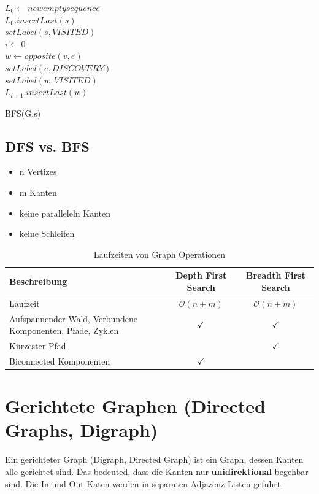 \begin{algorithm}[H]
	$L_0 \leftarrow new empty sequence$ \\
	$L_0.insertLast(s)$ \\
	$setLabel(s, VISITED)$ \\
	$i \leftarrow 0$ \\
	 {
		{
			{
				 {
					$w \leftarrow opposite(v,e)$ \\
					 {
						$setLabel(e, DISCOVERY)$ \\
						$setLabel(w, VISITED)$ \\
						$L_{i+1}.insertLast(w)$ \\
					}
				}
			}
		}
	}

	\caption{BFS(G,s)}
\end{algorithm}
\clearpage


\subsection{DFS vs. BFS}
\begin{itemize}
	\item n Vertizes
	\item m Kanten
	\item keine paralleleln Kanten
	\item keine Schleifen
\end{itemize}
\begin{table}[h]
	\centering
	\begin{tabu} to \linewidth {X c c}
		\toprule
		Beschreibung & Depth First Search & Breadth First Search \\
		\midrule
		Laufzeit & $\mathcal{O}(n+m)$ & $\mathcal{O}(n+m)$   \\
		Aufspannender Wald, Verbundene Komponenten, Pfade, Zyklen & $\checkmark$ & $\checkmark$  \\
		Kürzester Pfad &  & $\checkmark$   \\
		Biconnected Komponenten & $\checkmark$ &   \\
		\bottomrule
	\end{tabu}
	\caption{Laufzeiten von Graph Operationen}
\end{table}

\section{Gerichtete Graphen (Directed Graphs, Digraph)}
Ein gerichteter Graph (Digraph, Directed Graph) ist ein Graph, dessen Kanten alle gerichtet sind. Das bedeuted, dass die Kanten nur \textbf{unidirektional} begehbar sind. Die In und Out Katen werden in separaten Adjazenz Listen geführt.  

